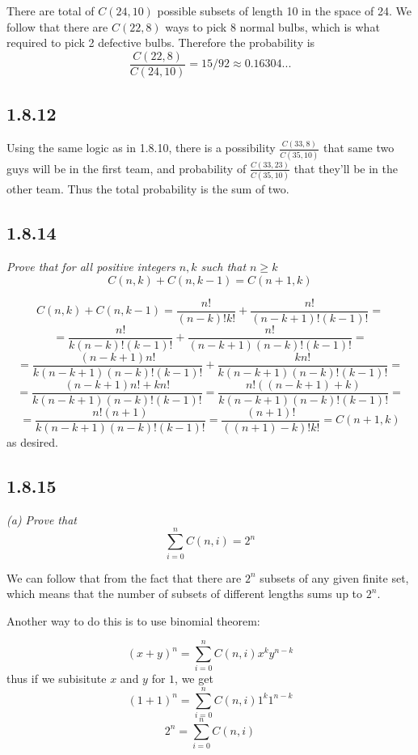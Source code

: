 \documentclass[11pt,oneside,titlepage]{book}
\begin{document}
There are total of $C(24, 10)$ possible subsets of length 10 in the space of 24.
We follow that there are $C(22, 8)$ ways to pick 8 normal bulbs, which is what required to pick
2 defective bulbs. Therefore the probability is 
$$\frac{C(22, 8)}{C(24, 10)} = 15/92 \approx 0.16304...$$

\subsection*{1.8.12}

Using the same logic as in 1.8.10, there is a possibility $\frac{C(33, 8)}{C(35, 10)}$
that same two guys will be in the first team, and probability of  $\frac{C(33, 23)}{C(35, 10)}$
that they'll be in the other team. Thus the total probability is the sum of two.



\subsection*{1.8.14}

\textit{Prove that for all positive integers $n, k$ such that $n \geq k$
  $$C(n, k) + C(n, k - 1) = C(n + 1, k)$$
}

$$ C(n, k) + C(n, k - 1) = \frac{n!}{(n - k)!k!} + \frac{n!}{(n - k + 1)!(k - 1)!} =$$
$$ =
\frac{n!}{k (n - k)!(k - 1)!} + \frac{n!}{(n - k + 1)(n - k)!(k - 1)!} =$$
$$ =
\frac{(n - k + 1)n!}{k(n - k + 1) (n - k)!(k - 1)!} + \frac{kn!}{k(n - k + 1)(n - k)!(k - 1)!} =
$$
$$ =
\frac{(n - k + 1)n! + kn!}{k(n - k + 1) (n - k)!(k - 1)!} =
\frac{n!((n - k + 1) + k)}{k(n - k + 1) (n - k)!(k - 1)!} = 
$$
$$ =
\frac{n!(n + 1)}{k(n - k + 1) (n - k)!(k - 1)!} =
\frac{(n + 1)!}{((n + 1) - k)!k!} = C(n + 1, k)
$$
as desired.

\subsection*{1.8.15}

\textit{(a) Prove that 
  $$\sum_{i = 0}^n{C(n, i)} = 2^n$$
}

We can follow that from the fact that there are $2^n$ subsets of any given finite set,
which means that the number of subsets of different lengths sums up to $2^n$.

Another way to do this is to use binomial theorem:

$$(x + y)^n = \sum_{i = 0}^n{C(n, i) x^k y^{n - k}}$$
thus if we subisitute $x$ and $y$ for $1$, we get
$$(1 + 1)^n = \sum_{i = 0}^n{C(n, i) 1^k 1^{n - k}}$$
$$2^n = \sum_{i = 0}^n{C(n, i)}$$
\end{document}
